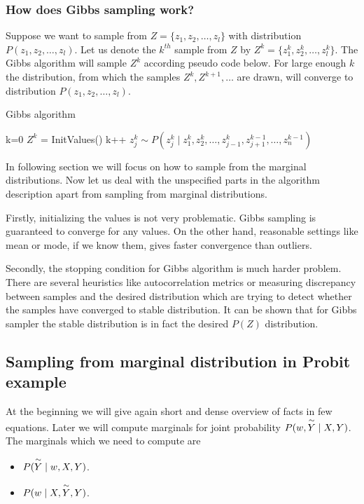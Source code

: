\subsubsection*{How does Gibbs sampling work?}
Suppose we want to sample from $Z = \{z_1, z_2, \ldots, z_l\}$ with distribution $P(z_1, z_2, \ldots, z_l)$. Let us denote the $k^{th}$ sample from $Z$ by $Z^k = \{z_1^k, z_2^k, \ldots, z_l^k\}$. The Gibbs algorithm will sample $Z^k$ according pseudo code below. For large enough $k$ the distribution, from which the samples $Z^k, Z^{k+1}, \ldots $ are drawn, will converge to distribution $P(z_1, z_2, \ldots, z_l)$. 


\begin{algorithm}
\caption{Gibbs algorithm} \label{gibbs_pseudo}
\begin{algorithmic}
\State k=0
\State $Z^k$ = InitValues()
    \State  k++
        \State $z_j^k \sim P(z_j^k  \mid z_1^k,z_2^k, \ldots, z_{j-1}^k, z_{j+1}^{k-1}, \ldots, z_{n}^{k-1})$
    \EndFor
\EndWhile
\end{algorithmic}
\end{algorithm}

In following section we will focus on how to sample from the marginal distributions. Now let us deal with the unspecified parts in the algorithm description apart from sampling from marginal distributions.

Firstly, initializing the values is not very problematic. Gibbs sampling is guaranteed to converge for any values. On the other hand, reasonable settings like mean or mode, if we know them,  gives faster convergence than outliers. \cite{gibbs_intro}

Secondly, the stopping condition for Gibbs algorithm is much harder problem. There are several heuristics like autocorrelation metrics or measuring discrepancy between samples and the desired distribution which are trying to detect whether the samples have converged to stable distribution. It can be shown that for Gibbs sampler the stable distribution is in fact the desired $P(Z)$ distribution. \cite{explaining_gibbs}


\subsection{Sampling from marginal distribution in Probit example} 
\label{sec:sampling_from_marginal_distribution_in_probit_example}
At the beginning we will give again short and dense overview of facts in few equations. Later we will compute marginals for joint probability $P(w, \overset{\sim}{Y} \mid X, Y)$. The marginals which we need to compute are 
\begin{itemize}
    \item $P(\overset{\sim}{Y} \mid w, X, Y)$.
    \item $P(w \mid X, \overset{\sim}{Y}, Y)$.
\end{itemize}

